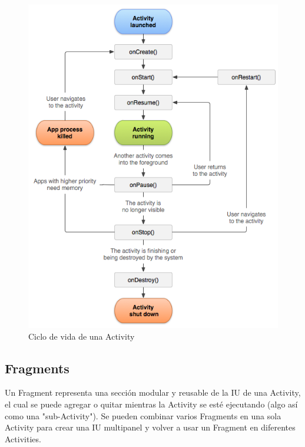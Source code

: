 \begin{figure}[H]
  \centering
    \includegraphics[scale=0.4]{04-framework/activity_lifecycle.png} 
   \caption{Ciclo de vida de una Activity}
   \label{fig:umlFrameworkCore}
\end{figure}


\subsection{Fragments}
Un Fragment representa una sección modular y reusable de la IU de una Activity, el cual se puede agregar o quitar mientras la Activity se esté ejecutando (algo así como una "sub-Activity"). Se pueden combinar varios Fragments en una sola Activity para crear una IU multipanel y volver a usar un Fragment en diferentes Activities.


